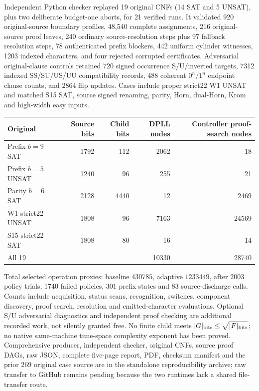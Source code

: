 \documentclass[11pt]{article}
\begin{document}
Independent Python checker replayed 19 original CNFs (14 SAT and 5 UNSAT), plus two deliberate budget-one aborts, for 21 verified runs. It validated 920 original-source boundary profiles, 48,540 complete assignments, 216 original-source proof leaves, 240 ordinary source-resolution steps plus 97 fallback resolution steps, 78 authenticated prefix blockers, 442 uniform cylinder witnesses, 1203 indexed characters, and four rejected corrupted certificates. Adversarial original-clause controls retained 720 signed occurrence S/U/inverted targets, 7312 indexed SS/SU/US/UU compatibility records, 488 coherent $0^n/1^n$ endpoint clause counts, and 2864 flip updates. Cases include proper strict22 W1 UNSAT and matched S15 SAT, source signed renaming, parity, Horn, dual-Horn, Krom and high-width easy inputs.

\begin{center}\begin{tabular}{lrrrr}\toprule
Original & Source bits & Child bits & DPLL nodes & Controller proof-search nodes\\\midrule
Prefix $b=9$ SAT &1792&112&2062&18\\
Prefix $b=5$ UNSAT &1240&96&255&21\\
Parity $b=6$ SAT &2128&4440&12&2469\\
W1 strict22 UNSAT &1808&96&7163&24569\\
S15 strict22 SAT &1808&80&16&14\\\midrule
All 19 & & &10330&28740\\\bottomrule
\end{tabular}\end{center}
Total selected operation proxies: baseline $430785$, adaptive $1233449$, after $2003$ policy trials, $1740$ failed policies, $301$ prefix states and $83$ source-discharge calls. Counts include acquisition, status scans, recognition, switches, component discovery, proof search, resolution and emitted-character evaluations. Optional S/U adversarial diagnostics and independent proof checking are additional recorded work, not silently granted free. No finite child meets $|G|_{\rm bits}\le\sqrt{|F|_{\rm bits}}$; no native same-machine time-space complexity exponent has been proved. Comprehensive producer, independent checker, original CNFs, source proof DAGs, raw JSON, complete five-page report, PDF, checksum manifest and the prior 269 original case source are in the standalone reproducibility archive; raw transfer to GitHub remains pending because the two runtimes lack a shared file-transfer route.
\end{document}
